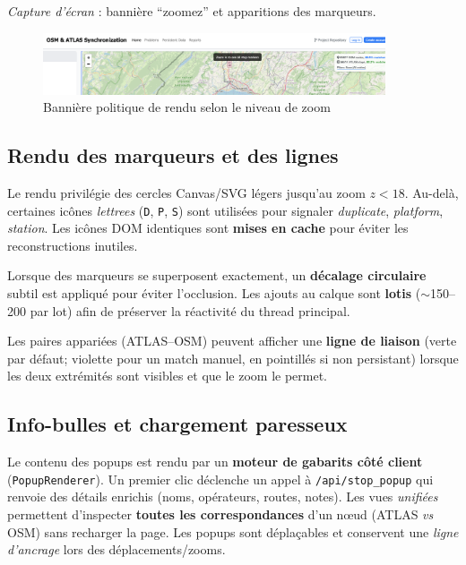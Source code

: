 \noindent
\textit{Capture d'écran} : bannière ``zoomez'' et apparitions des marqueurs.

\begin{figure}[h]
  \centering
  \includegraphics[width=0.9\textwidth]{../figures/chap9/zoom_in_to_see_all_stop_markers.png}
  \caption[Bannière de zoom]{Bannière politique de rendu selon le niveau de zoom}
  \label{fig:frontend-zoom-banner}
\end{figure}

\subsection{Rendu des marqueurs et des lignes}
Le rendu privilégie des cercles Canvas/SVG légers jusqu'au zoom \(z<18\). Au-delà, certaines icônes \textit{lettrees} (\texttt{D}, \texttt{P}, \texttt{S}) sont utilisées pour signaler \textit{duplicate}, \textit{platform}, \textit{station}. Les icônes DOM identiques sont \textbf{mises en cache} pour éviter les reconstructions inutiles.

Lorsque des marqueurs se superposent exactement, un \textbf{décalage circulaire} subtil est appliqué pour éviter l'occlusion. Les ajouts au calque sont \textbf{lotis} (\(\sim\)150–200 par lot) afin de préserver la réactivité du thread principal.

Les paires appariées (ATLAS–OSM) peuvent afficher une \textbf{ligne de liaison} (verte par défaut; violette pour un match manuel, en pointillés si non persistant) lorsque les deux extrémités sont visibles et que le zoom le permet.


\subsection{Info-bulles et chargement paresseux}
Le contenu des popups est rendu par un \textbf{moteur de gabarits côté client} (\texttt{PopupRenderer}). Un premier clic déclenche un appel à \texttt{/api/stop\_popup} qui renvoie des détails enrichis (noms, opérateurs, routes, notes). Les vues \textit{unifiées} permettent d'inspecter \textbf{toutes les correspondances} d'un nœud (ATLAS \emph{vs} OSM) sans recharger la page. Les popups sont déplaçables et conservent une \textit{ligne d'ancrage} lors des déplacements/zooms.

